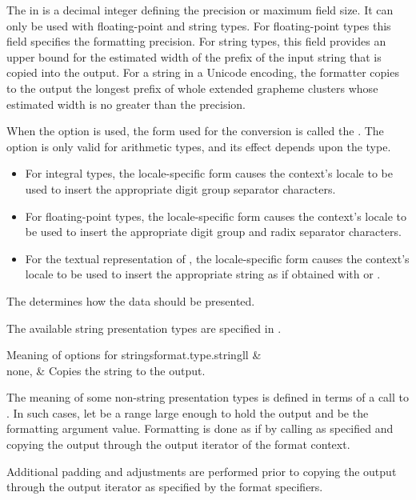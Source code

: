 \pnum
The  in
 is a decimal integer defining
the precision or maximum field size.
It can only be used with floating-point and string types.
For floating-point types this field specifies the formatting precision.
For string types, this field provides an upper bound
for the estimated width of the prefix of
the input string that is copied into the output.
For a string in a Unicode encoding,
the formatter copies to the output
the longest prefix of whole extended grapheme clusters
whose estimated width is no greater than the precision.

\pnum
When the  option is used, the form used for the conversion is called
the .
The  option is only valid for arithmetic types, and
its effect depends upon the type.
\begin{itemize}
\item
For integral types, the locale-specific form
causes the context's locale to be used
to insert the appropriate digit group separator characters.

\item
For floating-point types, the locale-specific form
causes the context's locale to be used
to insert the appropriate digit group and radix separator characters.

\item
For the textual representation of , the locale-specific form
causes the context's locale to be used
to insert the appropriate string as if obtained
with  or .
\end{itemize}

\pnum
The  determines how the data should be presented.

\pnum
The available string presentation types are specified in .
%
\begin{floattable}{Meaning of  options for strings}{format.type.string}{ll}
\topline
{} &  \\ \rowsep
none,  &
Copies the string to the output.
\\
\end{floattable}

\pnum
The meaning of some non-string presentation types
is defined in terms of a call to .
In such cases,
let  be a range
large enough to hold the  output
and  be the formatting argument value.
Formatting is done as if by calling  as specified
and copying the output through the output iterator of the format context.
\begin{note}
Additional padding and adjustments are performed
prior to copying the output through the output iterator
as specified by the format specifiers.
\end{note}

